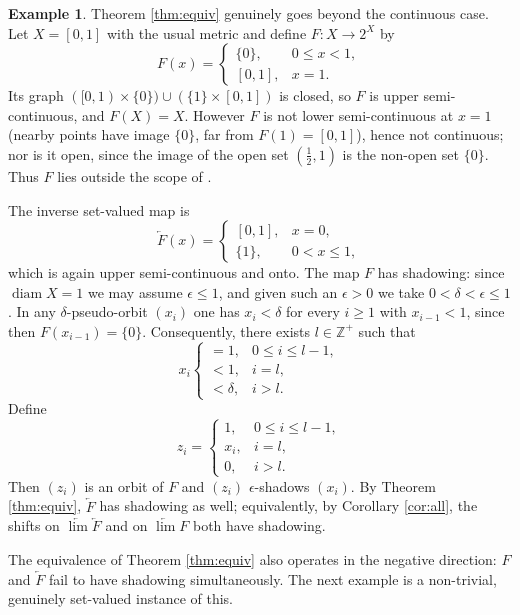 \documentclass[12pt]{amsart}
\theoremstyle{definition}
\newtheorem{example}{Example}%
\begin{document}
\begin{example}\label{ex:usc}
	Theorem \ref{thm:equiv} genuinely goes beyond the continuous case. Let $X=[0,1]$ with the usual metric and define $F:X\rightarrow 2^X$ by
	$$F(x)=\begin{cases}\{0\}, & 0\leq x<1,\\[2pt] [0,1], & x=1.\end{cases}$$
	Its graph $([0,1)\times\{0\})\cup(\{1\}\times[0,1])$ is closed, so $F$ is upper semi-continuous, and $F(X)=X$. However $F$ is not lower semi-continuous at $x=1$ (nearby points have image $\{0\}$, far from $F(1)=[0,1]$), hence not continuous; nor is it open, since the image of the open set $(\tfrac12,1)$ is the non-open set $\{0\}$. Thus $F$ lies outside the scope of \cite{KhanKumarDas}.
	
	The inverse set-valued map is
	$$\underleftarrow{F}(x)=\begin{cases}[0,1], & x=0,\\[2pt] \{1\}, & 0<x\leq1,\end{cases}$$
	which is again upper semi-continuous and onto. The map $F$ has shadowing: since $\operatorname{diam}X=1$ we may assume $\epsilon\leq1$, and given such an $\epsilon>0$ we take $0<\delta<\epsilon\leq1$. In any $\delta$-pseudo-orbit $(x_i)$ one has $x_i<\delta$ for every $i\geq1$ with $x_{i-1}<1$, since then $F(x_{i-1})=\{0\}$. Consequently, there exists $l\in\mathbb{Z^+}$ such that $$x_i\begin{cases}=1, & 0\leq i\leq l-1,\\<1, & i=l,\\ <\delta, & i>l.\end{cases}$$ Define $$z_i=\begin{cases}1, & 0\leq i\leq l-1,\\x_i, & i=l,\\ 0, & i>l.\end{cases}$$ Then $(z_i)$ is an orbit of $F$ and $(z_i)$ $\epsilon$-shadows $(x_i)$. By Theorem \ref{thm:equiv}, $\underleftarrow{F}$ has shadowing as well; equivalently, by Corollary \ref{cor:all}, the shifts on $\underleftarrow{\lim} \underleftarrow{F}$ and on $\underleftarrow{\lim} F$ both have shadowing.
	
\end{example}

The equivalence of Theorem \ref{thm:equiv} also operates in the negative direction: $F$ and $\underleftarrow{F}$ fail to have shadowing simultaneously. The next example is a non-trivial, genuinely set-valued instance of this.
\end{document}
